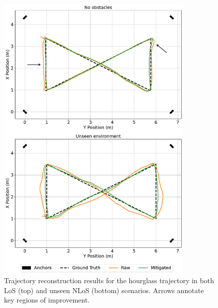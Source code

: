 \begin{figure}[tbh]
    \centering
    \includegraphics[width=0.85\textwidth]{Figures/experiments_and_results/hourglass_trajectory.pdf}
    \caption{Trajectory reconstruction results for the hourglass trajectory in both LoS (top) and unseen NLoS (bottom) scenarios. Arrows annotate key regions of improvement.}
    \label{fig:trajectories_hourglass}
\end{figure}

